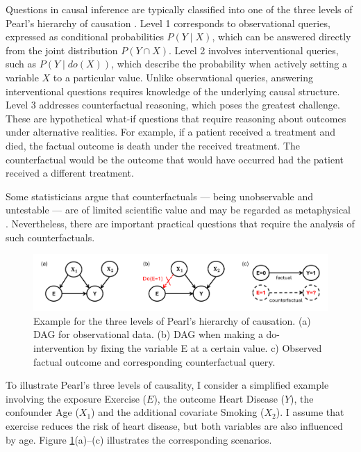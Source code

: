 Questions in causal inference are typically classified into one of the three levels of Pearl's hierarchy of causation \citep{pearl_book2009}. Level 1 corresponds to observational queries, expressed as conditional probabilities $P(Y \mid X)$, which can be answered directly from the joint distribution $P(Y \cap X)$. Level 2 involves interventional queries, such as $P(Y \mid do(X))$, which describe the probability when actively setting a variable $X$ to a particular value. Unlike observational queries, answering interventional questions requires knowledge of the underlying causal structure. Level 3 addresses counterfactual reasoning, which poses the greatest challenge. These are hypothetical what-if questions that require reasoning about outcomes under alternative realities. For example, if a patient received a treatment and died, the factual outcome is death under the received treatment. The counterfactual would be the outcome that would have occurred had the patient received a different treatment.

 
Some statisticians argue that counterfactuals --- being unobservable and untestable --- are of limited scientific value and may be regarded as metaphysical \citep{dawid2000}. Nevertheless, there are important practical questions that require the analysis of such counterfactuals.



\begin{figure}[H]
\centering
\includegraphics[width=1\textwidth]{img/pearl_levels.png}
\caption{Example for the three levels of Pearl's hierarchy of causation. (a) DAG for observational data. (b) DAG when making a do-intervention by fixing the variable E at a certain value. c) Observed factual outcome and corresponding counterfactual query.}
\label{fig:pearl_levels}
\end{figure}


To illustrate Pearl's three levels of causality, I consider a simplified example involving the exposure Exercise ($E$), the outcome Heart Disease ($Y$), the confounder Age ($X_1$) and the additional covariate Smoking ($X_2$). I assume that exercise reduces the risk of heart disease, but both variables are also influenced by age. Figure \ref{fig:pearl_levels}(a)--(c) illustrates the corresponding scenarios.





